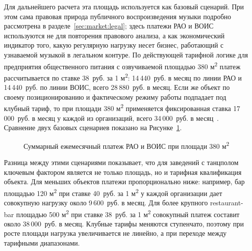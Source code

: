 Для дальнейшего расчета эта площадь используется как базовый сценарий. При этом сама правовая природа публичного воспроизведения музыки подробно рассмотрена в разделе~\ref{sec:market:legal}; здесь платежи РАО и ВОИС используются не для повторения правового анализа, а как экономический индикатор того, какую регулярную нагрузку несет бизнес, работающий с узнаваемой музыкой в легальном контуре. По действующей тарифной логике для предприятия общественного питания с озвучиваемой площадью 380 м\textsuperscript{2} платеж рассчитывается по ставке 38~руб. за 1 м\textsuperscript{2}: 14\,440~руб. в месяц по линии РАО и 14\,440~руб. по линии ВОИС, всего 28\,880~руб. в месяц. Если же объект по своему позиционированию и фактическому режиму работы подпадает под клубный тариф, то при площади 380 м\textsuperscript{2} применяется фиксированная ставка 17\,000~руб. в месяц у каждой из организаций, всего 34\,000~руб. в месяц~\cite{rao_tariffs_2024,vois_tariffs_2024}. Сравнение двух базовых сценариев показано на Рисунке~\ref{fig:market:rao-vois-payment}.

\begin{figure}[htbp]
\centering
{}
\caption{Суммарный ежемесячный платеж РАО и ВОИС при площади 380 м\textsuperscript{2}}
\label{fig:market:rao-vois-payment}
\end{figure}

Разница между этими сценариями показывает, что для заведений с танцполом ключевым фактором является не только площадь, но и тарифная квалификация объекта. Для меньших объектов платежи пропорционально ниже: например, бар площадью 120 м\textsuperscript{2} при ставке 40~руб. за 1 м\textsuperscript{2} у каждой организации дает совокупную нагрузку около 9\,600~руб. в месяц. Для более крупного restaurant-bar площадью 500 м\textsuperscript{2} при ставке 38~руб. за 1 м\textsuperscript{2} совокупный платеж составит около 38\,000~руб. в месяц. Клубные тарифы меняются ступенчато, поэтому при росте площади нагрузка увеличивается не линейно, а при переходе между тарифными диапазонами.

